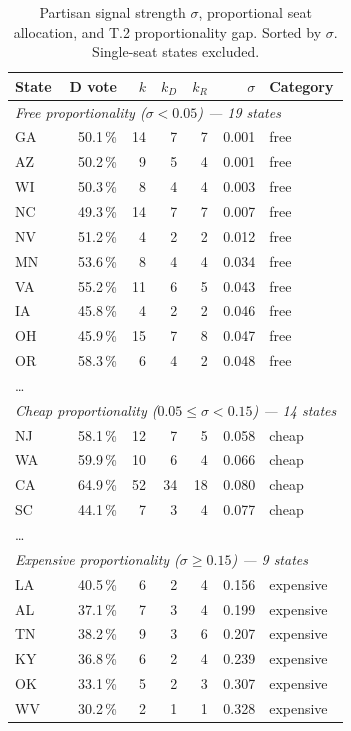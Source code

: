 \begin{table}[h]
\centering
\caption{Partisan signal strength $\sigma$, proportional seat allocation, and
T.2 proportionality gap.  Sorted by $\sigma$. Single-seat states excluded.}
\label{tab:sigma}
\small
\begin{tabular}{lrrrrrl}
\toprule
State & D vote & $k$ & $k_D$ & $k_R$ & $\sigma$ & Category \\
\midrule
\multicolumn{7}{l}{\textit{Free proportionality ($\sigma < 0.05$) — 19 states}} \\
GA & 50.1\,\% & 14 & 7 & 7 & 0.001 & free \\
AZ & 50.2\,\% &  9 & 5 & 4 & 0.001 & free \\
WI & 50.3\,\% &  8 & 4 & 4 & 0.003 & free \\
NC & 49.3\,\% & 14 & 7 & 7 & 0.007 & free \\
NV & 51.2\,\% &  4 & 2 & 2 & 0.012 & free \\
MN & 53.6\,\% &  8 & 4 & 4 & 0.034 & free \\
VA & 55.2\,\% & 11 & 6 & 5 & 0.043 & free \\
IA & 45.8\,\% &  4 & 2 & 2 & 0.046 & free \\
OH & 45.9\,\% & 15 & 7 & 8 & 0.047 & free \\
OR & 58.3\,\% &  6 & 4 & 2 & 0.048 & free \\
\ldots \\
\midrule
\multicolumn{7}{l}{\textit{Cheap proportionality ($0.05 \leq \sigma < 0.15$) — 14 states}} \\
NJ & 58.1\,\% & 12 & 7 & 5 & 0.058 & cheap \\
WA & 59.9\,\% & 10 & 6 & 4 & 0.066 & cheap \\
CA & 64.9\,\% & 52 & 34 & 18 & 0.080 & cheap \\
SC & 44.1\,\% &  7 & 3 & 4 & 0.077 & cheap \\
\ldots \\
\midrule
\multicolumn{7}{l}{\textit{Expensive proportionality ($\sigma \geq 0.15$) — 9 states}} \\
LA & 40.5\,\% &  6 & 2 & 4 & 0.156 & expensive \\
AL & 37.1\,\% &  7 & 3 & 4 & 0.199 & expensive \\
TN & 38.2\,\% &  9 & 3 & 6 & 0.207 & expensive \\
KY & 36.8\,\% &  6 & 2 & 4 & 0.239 & expensive \\
OK & 33.1\,\% &  5 & 2 & 3 & 0.307 & expensive \\
WV & 30.2\,\% &  2 & 1 & 1 & 0.328 & expensive \\
\bottomrule
\end{tabular}
\end{table}

